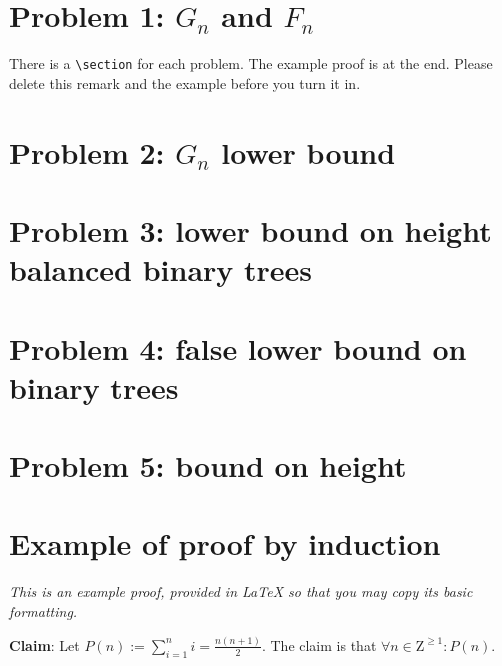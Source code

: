 \documentclass[titlepage]{article}
\begin{document}
 \maketitle

\section{Problem 1: $G_n$ and $F_n$}

There is a \verb|\section| for each problem.  The example proof is at the end.  Please delete this remark and the example before you turn it in.

\section{Problem 2: $G_n$ lower bound}

\section{Problem 3: lower bound on height balanced binary trees}

\section{Problem 4: false lower bound on binary trees}

\section{Problem 5: bound on height}

\section{Example of proof by induction}

\emph{This is an example proof, provided in LaTeX so that you may copy its basic formatting.}

\textbf{Claim}: Let $P(n) := \sum_{i=1}^n i = \frac{n(n+1)}{2}$.  The claim is that $\forall n \in \mathrm{Z}^{\geq 1}: P(n)$.
\end{document}
